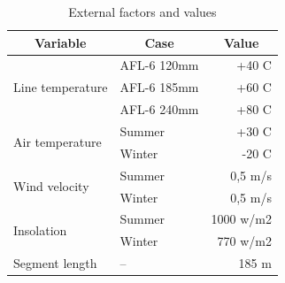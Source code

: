 \documentclass[a4paper]{article}
\begin{document}
\begin{table}[!h]
\centering
\caption{External factors and values}
\label{tab:extProperties}
\begin{tabular}{|l|l|r|}
\hline
\multicolumn{1}{|c|}{Variable}    & \multicolumn{1}{c|}{Case} & \multicolumn{1}{c|}{Value} \\ \hline
\multirow{3}{*}{Line temperature} & AFL-6  120mm              & +40 C                      \\ \cline{2-3} 
                                  & AFL-6 185mm               & +60 C                      \\ \cline{2-3} 
                                  & AFL-6 240mm               & +80 C                      \\ \hline
\multirow{2}{*}{Air temperature}  & Summer                    & +30 C                      \\ \cline{2-3} 
                                  & Winter                    & -20 C                      \\ \hline
\multirow{2}{*}{Wind velocity}    & Summer                    & 0,5 m/s                    \\ \cline{2-3} 
                                  & Winter                    & 0,5 m/s                    \\ \hline
\multirow{2}{*}{Insolation}       & Summer                    & 1000 w/m2                  \\ \cline{2-3} 
                                  & Winter                    & 770 w/m2                   \\ \hline
Segment length                    & --                        & 185 m                      \\ \hline
\end{tabular}
\end{table}

\clearpage

\end{document}

